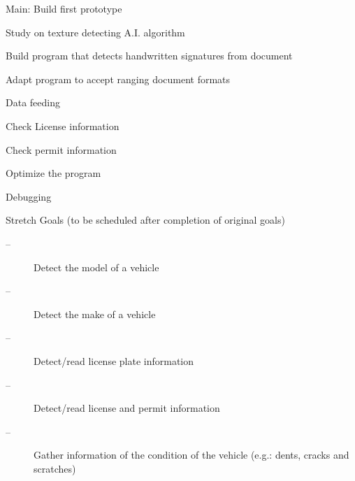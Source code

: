 \documentclass[onecolumn, draftclsnofoot,10pt, compsoc]{IEEEtran}
\begin{document}
\color{black}
Main: Build first prototype
\begin{description}
	\color{Orange}
	\item[--]Study on texture detecting A.I. algorithm
	\color{blue}
	\item[--]Build program that detects handwritten signatures from document
	\color{purple}
	\item[--]Adapt program to accept ranging document formats
	\begin{description}
		\color{black}
		\item[--]Data feeding
		\item[--]Check License information
		\item[--]Check permit information
	\end{description}
	\color{brown}
	\item[--]Optimize the program
	\begin{description}
		\color{black}
		\item[--]Debugging
	\end{description}
\end{description}
Stretch Goals (to be scheduled after completion of original goals)
\begin{description}
	\item[--]Detect the model of a vehicle
	\item[--]Detect the make of a vehicle
	\item[--]Detect/read license plate information
	\item[--]Detect/read license and permit information
	\item[--]Gather information of the condition of the vehicle (e.g.: dents, cracks and scratches)
\end{description}
\end{document}

